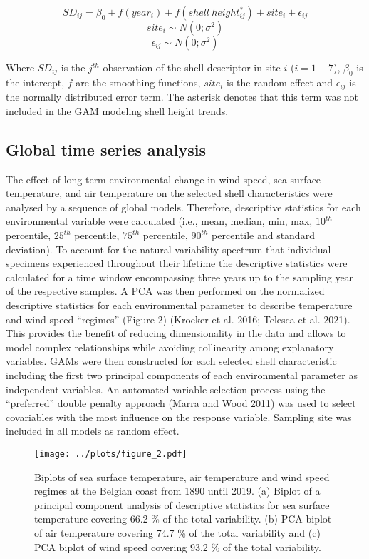 \documentclass[smallextended]{svjour3}       %
\begin{document}
\[
SD_{ij} = \beta_0 + f(year_i) + f(shell\:height_{ij}^*) + site_i + \epsilon_{ij}
\] \[
site_i \sim N(0; \sigma^2)
\] \[
\epsilon_{ij} \sim N(0; \sigma^2)
\]

Where \(SD_{ij}\) is the \(j^{th}\) observation of the shell descriptor
in site \(i\) (\(i = 1-7\)), \(\beta_0\) is the intercept, \(f\) are the
smoothing functions, \(site_i\) is the random-effect and
\(\epsilon_{ij}\) is the normally distributed error term. The asterisk
denotes that this term was not included in the GAM modeling shell height
trends.

\hypertarget{global-time-series-analysis}{%
\subsection{Global time series
analysis}\label{global-time-series-analysis}}

The effect of long-term environmental change in wind speed, sea surface
temperature, and air temperature on the selected shell characteristics
were analysed by a sequence of global models. Therefore, descriptive
statistics for each environmental variable were calculated (i.e., mean,
median, min, max, \(10^{th}\) percentile, \(25^{th}\) percentile,
\(75^{th}\) percentile, \(90^{th}\) percentile and standard deviation).
To account for the natural variability spectrum that individual
specimens experienced throughout their lifetime the descriptive
statistics were calculated for a time window encompassing three years up
to the sampling year of the respective samples. A PCA was then performed
on the normalized descriptive statistics for each environmental
parameter to describe temperature and wind speed ``regimes'' (Figure 2)
(Kroeker et al. 2016; Telesca et al. 2021). This provides the benefit of
reducing dimensionality in the data and allows to model complex
relationships while avoiding collinearity among explanatory variables.
GAMs were then constructed for each selected shell characteristic
including the first two principal components of each environmental
parameter as independent variables. An automated variable selection
process using the ``preferred'' double penalty approach (Marra and Wood
2011) was used to select covariables with the most influence on the
response variable. Sampling site was included in all models as random
effect.

\begin{figure}
\centering
\texttt{[image: ../plots/figure\_2.pdf]}
\caption{Biplots of sea surface temperature, air temperature and wind
speed regimes at the Belgian coast from 1890 until 2019. (a) Biplot of a
principal component analysis of descriptive statistics for sea surface
temperature covering 66.2 \% of the total variability. (b) PCA biplot of
air temperature covering 74.7 \% of the total variability and (c) PCA
biplot of wind speed covering 93.2 \% of the total variability.}
\end{figure}
\end{document}
